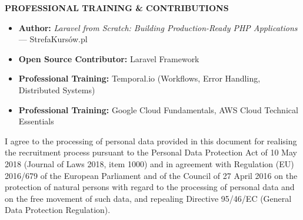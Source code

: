 \documentclass[9pt,a4paper]{article}
\newcommand{\cvsection}[1]{%
  \vspace{8pt}%
  {\bfseries #1}\par
  \vspace{4pt}%
}
\begin{document}
\cvsection{PROFESSIONAL TRAINING \& CONTRIBUTIONS}
\begin{itemize}
  \item \textbf{Author:} \textit{Laravel from Scratch: Building Production-Ready PHP Applications} — StrefaKursów.pl
  \item \textbf{Open Source Contributor:} Laravel Framework
  \item \textbf{Professional Training:} Temporal.io (Workflows, Error Handling, Distributed Systems)
  \item \textbf{Professional Training:} Google Cloud Fundamentals, AWS Cloud Technical Essentials
\end{itemize}

\vfill
\scriptsize
I agree to the processing of personal data provided in this document for realising the recruitment process pursuant to the Personal Data Protection Act of 10 May 2018 (Journal of Laws 2018, item 1000)
and in agreement with Regulation (EU) 2016/679 of the European Parliament and of the Council of 27 April 2016 on the protection of natural persons with regard to the processing of personal data and
on the free movement of such data, and repealing Directive 95/46/EC (General Data Protection Regulation).
\end{document}
